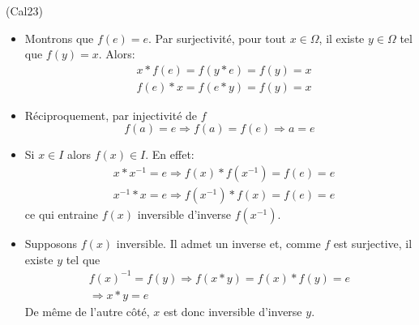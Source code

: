 \begin{tiny}(Cal23)\end{tiny}
\begin{itemize}
  \item Montrons que $f(e)=e$. Par surjectivité, pour tout $x\in \Omega$, il existe $y\in \Omega$ tel que $f(y)=x$. Alors: 
\begin{displaymath}
\begin{aligned}
&x*f(e) = f(y*e) = f(y) = x \\
&f(e) * x = f(e*y) = f(y) =x  
\end{aligned}
\end{displaymath}
  \item Réciproquement, par injectivité de $f$
\begin{displaymath}
  f(a)=e \Rightarrow f(a)=f(e) \Rightarrow a = e
\end{displaymath}
  \item Si $x\in I$ alors $f(x)\in I$. En effet:
\begin{displaymath}
\begin{aligned}
  &x*x^{-1} = e \Rightarrow f(x) * f(x^{-1})=f(e)=e\\
  &x^{-1}*x = e \Rightarrow f(x^{-1}) * f(x)=f(e)=e
\end{aligned}
\end{displaymath}
ce qui entraine $f(x)$ inversible d'inverse $f(x^{-1})$.
\item Supposons $f(x)$ inversible. Il admet un inverse et, comme $f$ est surjective, il existe $y$ tel que
\begin{multline*}
  f(x)^{-1} = f(y)
\Rightarrow f(x*y) = f(x)*f(y) = e\\
\Rightarrow x*y = e
\end{multline*}
De même de l'autre côté, $x$ est donc inversible d'inverse $y$.
\end{itemize}
